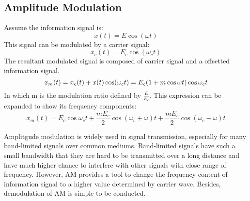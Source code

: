 \documentclass[12pt]{article}[times]
\begin{document}
\subsection{Amplitude Modulation}
Assume the information signal is:
\begin{equation}
  x(t) = E\cos(\omega t)
\end{equation}
This signal can be modulated by a carrier signal:
\begin{equation}
  x_c(t) = E_c \cos(\omega_c t)
\end{equation}
The resultant modulated signal is composed of carrier signal and
a offsetted information signal.
\begin{equation}
  x_m(t) = x_c(t) + x(t)\cos(\omega_c t) \\
  = E_c(1+m\cos{\omega t})\cos{\omega_c t}
\end{equation}
In which m is the modulation ratio defined by $\frac{E}{E_c}$. This
expression can be expanded to show its frequency components:
\begin{equation}
  x_m(t) = E_c \cos{\omega_c t} + \frac{mE_c}{2}\cos{(\omega_c + \omega)t} + \frac{mE_c}{2}\cos{(\omega_c - \omega)t}
\end{equation}

Amplitgude modulation is widely used in signal transmission, especially
for many band-limited signals over common mediums. Band-limited
signals have such a small bandwidth that they are hard to be
transmitted over a long distance and have much higher chance to 
interfere with other signals with close range of frequency. 
\newline
However, AM provides a tool to change the frequency content of 
information signal to a higher value determined by carrier wave.
Besides, demodulation of AM is simple to be conducted.
\end{document}
